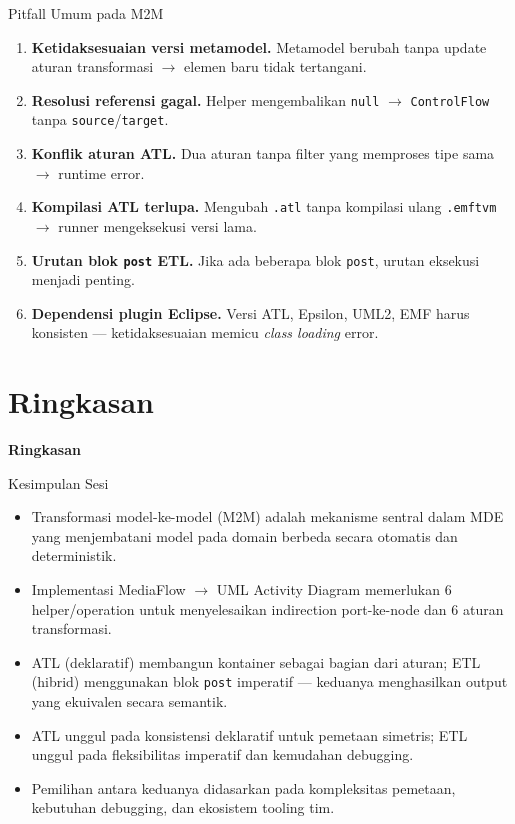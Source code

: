 \documentclass[aspectratio=169, table]{beamer}
\begin{document}
\begin{frame}{Pitfall Umum pada M2M}
\vspace{14pt}
\begin{enumerate}
  \item \textbf{Ketidaksesuaian versi metamodel.} Metamodel berubah tanpa update aturan transformasi $\rightarrow$ elemen baru tidak tertangani.
  \item \textbf{Resolusi referensi gagal.} Helper mengembalikan \texttt{null} $\rightarrow$ \texttt{ControlFlow} tanpa \texttt{source}/\texttt{target}.
  \item \textbf{Konflik aturan ATL.} Dua aturan tanpa filter yang memproses tipe sama $\rightarrow$ runtime error.
  \item \textbf{Kompilasi ATL terlupa.} Mengubah \texttt{.atl} tanpa kompilasi ulang \texttt{.emftvm} $\rightarrow$ runner mengeksekusi versi lama.
  \item \textbf{Urutan blok \texttt{post} ETL.} Jika ada beberapa blok \texttt{post}, urutan eksekusi menjadi penting.
  \item \textbf{Dependensi plugin Eclipse.} Versi ATL, Epsilon, UML2, EMF harus konsisten --- ketidaksesuaian memicu \textit{class loading} error.
\end{enumerate}
\end{frame}

\section{Ringkasan}
\begin{frame}{\hfill}
	\centering
	\Huge{\textbf{Ringkasan}}
\end{frame}

\begin{frame}{Kesimpulan Sesi}
\vspace{12pt}
\begin{itemize}
  \item Transformasi model-ke-model (M2M) adalah mekanisme sentral dalam MDE yang menjembatani model pada domain berbeda secara otomatis dan deterministik.
  \item Implementasi MediaFlow $\rightarrow$ UML Activity Diagram memerlukan 6 helper/operation untuk menyelesaikan indirection port-ke-node dan 6 aturan transformasi.
  \item ATL (deklaratif) membangun kontainer sebagai bagian dari aturan; ETL (hibrid) menggunakan blok \texttt{post} imperatif --- keduanya menghasilkan output yang ekuivalen secara semantik.
  \item ATL unggul pada konsistensi deklaratif untuk pemetaan simetris; ETL unggul pada fleksibilitas imperatif dan kemudahan debugging.
  \item Pemilihan antara keduanya didasarkan pada kompleksitas pemetaan, kebutuhan debugging, dan ekosistem tooling tim.
\end{itemize}
\end{frame}
\end{document}
